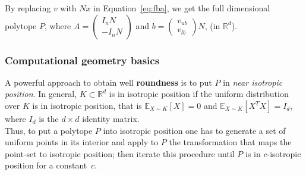 \documentclass{beamer}
\begin{document}
\begin{frame}
      \footnotesize
      By replacing $v$ with $Nx$ in Equation~\ref{eq:fba}, we get the full dimensional polytope $P$,  
      where 
      $A = \begin{pmatrix} I_n N \\ -I_n N\end{pmatrix}$
      and 
      $b = \begin{pmatrix} v_{ub} \\ v_{lb} \end{pmatrix}  N$, (in $\mathbb{R}^d$).

   \end{frame}

   \begin{frame}
      \frametitle{Computational geometry basics}

      \footnotesize
      A powerful approach to
      obtain well \textbf{roundness} is to put $P$ in \emph{near isotropic position}. 
      In
      general, $K \subset \mathbb{R}^d$ is in isotropic position if the uniform distribution
      over $K$ is in isotropic position, that is $\mathbb{E}_{X\sim K}[X] = 0$ and
      $\mathbb{E}_{X\sim K}[X^TX] = I_d$, where $I_d$ is the $d\times d$ identity
      matrix. \\
      \bigskip
      Thus, to put a polytope $P$ into isotropic position one has to generate
      a set of uniform points in its interior and apply to $P$ the transformation that
      maps the point-set to isotropic position; then iterate this procedure until $P$
      is in $c$-isotropic position for a constant~$c$.
   \end{frame}
\end{document}
